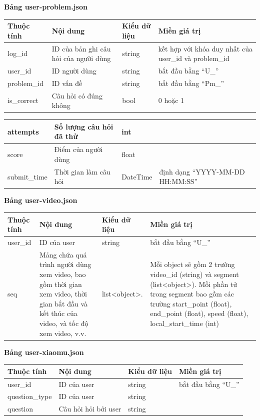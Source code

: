%
%
\textbf{Bảng user-problem.json}
\begin{center}
\begin{tabular}{|| m{7em}  m{10em}  m{11em}  m{5em}||} 
 \hline
 Thuộc tính & Nội dung & Kiểu dữ liệu & Miền giá trị \\ [0.5ex] 
 \hline\hline
log\_id & ID của bản ghi câu hỏi của người dùng & string & kết hợp với khóa duy nhất của user\_id và problem\_id\\
 \hline
 user\_id &ID người dùng  & string & bắt đầu bằng “U\_” \\ \hline
problem\_id & ID vấn đề &string &bắt đầu bằng “Pm\_”\\
 \hline
is\_correct & Câu hỏi có đúng không  &bool &0 hoặc 1\\ [1ex] 
 \hline
\end{tabular}
\end{center}
%
%
\begin{center}
\begin{tabular}{|| m{7em}  m{10em}  m{11em}  m{5em}||} 
 \hline
attempts &Số lượng câu hỏi đã thử & int & \\
 \hline
 score &Điểm của người dùng  & float &  \\ \hline
submit\_time & Thời gian làm câu hỏi  &DateTime & định dạng “YYYY-MM-DD HH:MM:SS”\\ [1ex] 
 \hline
\end{tabular}
\end{center}
%
\textbf{Bảng user-video.json}
\begin{center}
\begin{tabular}{|| m{5em}  m{8em}  m{6em}  m{11em}||} 
 \hline
 Thuộc tính & Nội dung & Kiểu dữ liệu & Miền giá trị \\ [0.5ex] 
 \hline\hline
user\_id & ID của user & string & bắt đầu bằng “U\_”\\
 \hline
seq & Mảng chứa quá trình người dùng xem video, bao gồm thời gian xem video, thời gian bắt đầu và kết thúc của video, và tốc độ xem video, v.v. &list<object>.  &Mỗi object sẽ gồm 2 trường video\_id (string) và segment (list<object>). Mỗi phần tử trong segment bao gồm các trường start\_point (float), end\_point (float), speed (float), local\_start\_time (int)\\ [1ex] 
 \hline
\end{tabular}
\end{center}
%
\textbf{Bảng user-xiaomu.json}
\begin{center}
\begin{tabular}{|| m{7em}  m{10em}  m{7em}  m{7em}||} 
 \hline
 Thuộc tính & Nội dung & Kiểu dữ liệu & Miền giá trị \\ [0.5ex] 
 \hline\hline
user\_id & ID của user & string & bắt đầu bằng “U\_”\\
 \hline
question\_type & ID của user & string &\\
 \hline
question & Câu hỏi hỏi bởi user &string  &\\ [1ex] 
 \hline
\end{tabular}
\end{center}
